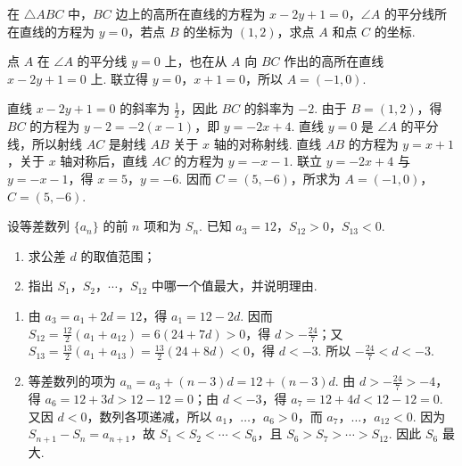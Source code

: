 \documentclass[UTF8,a4paper,oneside,11pt]{ctexbook}
\begin{document}
\begin{problem}
在 \(\triangle ABC\) 中，\(BC\) 边上的高所在直线的方程为 \(x-2y+1=0\)，\(\angle A\) 的平分线所在直线的方程为 \(y=0\)，若点 \(B\) 的坐标为 \(\left(1,2\right)\)，求点 \(A\) 和点 \(C\) 的坐标.

\begin{solution}
点 \(A\) 在 \(\angle A\) 的平分线 \(y=0\) 上，也在从 \(A\) 向 \(BC\) 作出的高所在直线 \(x-2y+1=0\) 上. 联立得 \(y=0\)，\(x+1=0\)，所以 \(A=(-1,0)\).

直线 \(x-2y+1=0\) 的斜率为 \(\frac{1}{2}\)，因此 \(BC\) 的斜率为 \(-2\). 由于 \(B=(1,2)\)，得 \(BC\) 的方程为 \(y-2=-2(x-1)\)，即 \(y=-2x+4\). 直线 \(y=0\) 是 \(\angle A\) 的平分线，所以射线 \(AC\) 是射线 \(AB\) 关于 \(x\) 轴的对称射线. 直线 \(AB\) 的方程为 \(y=x+1\)，关于 \(x\) 轴对称后，直线 \(AC\) 的方程为 \(y=-x-1\). 联立 \(y=-2x+4\) 与 \(y=-x-1\)，得 \(x=5\)，\(y=-6\). 因而 \(C=(5,-6)\)，所求为 \(A=(-1,0)\)，\(C=(5,-6)\).
\end{solution}
\end{problem}

\begin{problem}
设等差数列 \(\{a_{n}\}\) 的前 \(n\) 项和为 \(S_{n}\). 已知 \(a_{3}=12\)，\(S_{12}>0\)，\(S_{13}<0\).

\begin{enumerate}
\item 求公差 \(d\) 的取值范围；
\item 指出 \(S_{1}\)，\(S_{2}\)，\(\cdots\)，\(S_{12}\) 中哪一个值最大，并说明理由.
\end{enumerate}
\begin{solution}
\begin{enumerate}
\item 由 \(a_3=a_1+2d=12\)，得 \(a_1=12-2d\). 因而
\(S_{12}=\frac{12}{2}(a_1+a_{12})=6\left(24+7d\right)>0\)，得 \(d>-\frac{24}{7}\)；又
\(S_{13}=\frac{13}{2}(a_1+a_{13})=\frac{13}{2}\left(24+8d\right)<0\)，得 \(d<-3\). 所以 \(-\frac{24}{7}<d<-3\).
\item 等差数列的项为 \(a_n=a_3+(n-3)d=12+(n-3)d\). 由 \(d>-\frac{24}{7}>-4\)，得 \(a_6=12+3d>12-12=0\)；由 \(d<-3\)，得 \(a_7=12+4d<12-12=0\). 又因 \(d<0\)，数列各项递减，所以 \(a_1\)，\(\ldots\)，\(a_6>0\)，而 \(a_7\)，\(\ldots\)，\(a_{12}<0\). 因为 \(S_{n+1}-S_n=a_{n+1}\)，故 \(S_1<S_2<\cdots<S_6\)，且 \(S_6>S_7>\cdots>S_{12}\). 因此 \(S_6\) 最大.
\end{enumerate}
\end{solution}
\end{problem}

\end{document}
